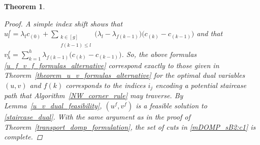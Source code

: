 \documentclass[letterpaper]{article}
\newtheorem{theorem}{Theorem}[section]
\begin{document}
\begin{theorem}
\begin{proof}
        A simple index shift shows that $u^f_{l} = \lambda_l c_{(0)} + \sum_{\substack{k \in [g] \\ f(k-1) \leq l}} \bigl( \lambda_{l} - \lambda_{f(k-1)} \bigr) \bigl( c_{(k)} - c_{(k-1)} \bigr)$ and that $v^f_{h} = \sum_{k = 1}^{h} \lambda_{f(k-1)} \bigl( c_{(k)} - c_{(k-1)} \bigr)$. So, the above formulas \eqref{u_f_v_f_formulas_alternative} correspond exactly to those given in Theorem~\ref{theorem_u_v_formulas_alternative} for the optimal dual variables $(u, v)$ and $f(k)$ corresponds to the indices $i_j$ encoding a potential staircase path that Algorithm~\ref{NW_corner_rule} may traverse. By Lemma~\ref{u_v_dual_feasibility}, $(u^f, v^f)$ is a feasible solution to \eqref{staircase_dual}. With the same argument as in the proof of Theorem~\ref{transport_domp_formulation}, the set of cuts in \eqref{mDOMP_sB2:c1} is complete.
        

\end{proof}
\end{theorem}
\end{document}

